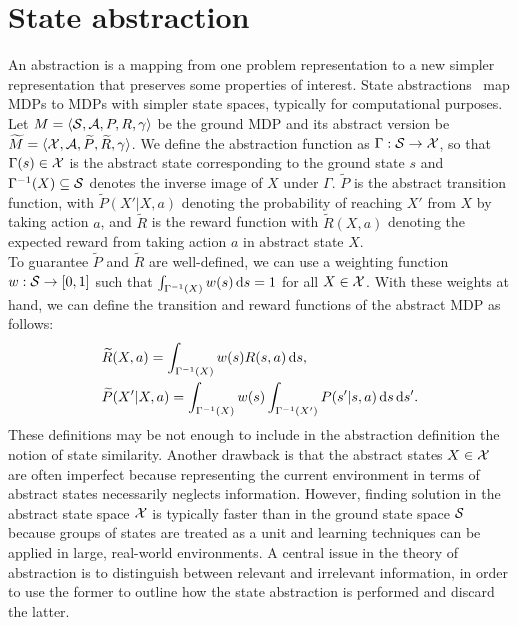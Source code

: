 \section{State abstraction} \label{sec:stdisc}

An abstraction is a mapping from one problem representation to a new simpler representation that preserves some properties of interest. State abstractions~\citep{lihong2006towards} map MDPs to MDPs with simpler state spaces, typically for computational purposes. Let $ M = \langle \mathcal{S}, \mathcal{A}, P, R, \gamma \rangle$ be the ground MDP and its abstract version be $\widetilde{M} = \langle \mathcal{X}, \mathcal{A}, \widetilde{P}, \widetilde{R}, \gamma \rangle$. We define the abstraction function as $\Gamma: \mathcal{S} \to \mathcal{X}$, so that $\Gamma(s)\in\mathcal{X}$ is the abstract state corresponding to the ground state $s$ and $\Gamma^{-1}(X)\subseteq\mathcal{S}$ denotes the inverse image of $X$ under $\Gamma$. $\widetilde{P}$ is the abstract transition function, with $\widetilde{P}(X'|X,a)$ denoting the probability of reaching $X'$ from $X$ by taking action $a$, and $\widetilde{R}$ is the reward function with $\widetilde{R}(X,a)$ denoting the expected reward from taking action $a$ in abstract state $X$.\\
\newline
To guarantee $\widetilde{P}$ and $\widetilde{R}$ are well-defined, we can use a weighting function  $w: \mathcal{S} \to [0, 1]$ such that $\int_{\Gamma^{-1}(X)} w(s)\,\mathrm{d} s = 1$ for all $X \in \mathcal{X}$. With these weights at hand, we can define the transition and reward functions of the abstract MDP as follows:
%
\begin{align}
&\widetilde{R}(X,a) = \int_{\Gamma^{-1}(X)}w(s)R(s,a)\,\mathrm{d} s,\nonumber \\
&\widetilde{P}(X'|X,a) = \int_{\Gamma^{-1}(X)}w(s)\int_{\Gamma^{-1}(X')} P(s'|s,a)\,\mathrm{d} s\,\mathrm{d} s'.\nonumber
\end{align}
%
These definitions may be not enough to include in the abstraction definition the notion of state similarity. Another drawback is that the abstract states $X \in \mathcal{X}$ are often imperfect because representing the current environment in terms of abstract states necessarily neglects information. However, finding solution in the abstract state space $\mathcal{X}$ is typically faster than in the ground state space $\mathcal{S}$ because groups of states are treated as a unit and learning techniques can be applied in large, real-world environments. A central issue in the theory of abstraction is to distinguish between relevant and irrelevant information, in order to use the former to outline how the state abstraction is performed and discard the latter.\\
